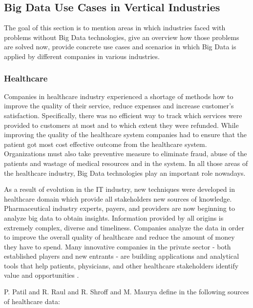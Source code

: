 \documentclass[runningheads]{llncs}
\begin{document}
\subsection{Big Data Use Cases in Vertical Industries}
The goal of this section is to mention areas in which industries faced with problems without Big Data technologies, give an overview how those problems are solved now, provide concrete use cases and scenarios in which Big Data is applied by different companies in various industries.

\subsubsection{Healthcare}

Companies in healthcare industry experienced a shortage of methods how to improve the quality of their service, reduce expenses and increase customer's satisfaction. Specifically, there was no efficient way to track which services were provided to customers at most and to which extent they were refunded. While improving the quality of the healthcare system companies had to ensure that the patient got most cost effective outcome from the healthcare system. Organizations must also take preventive measure to eliminate fraud, abuse of the patients and wastage of medical resources and in the system. In all those areas of the healthcare industry, Big Data technologies play an important role nowadays.

As a result of evolution in the IT industry, new techniques were developed in healthcare domain which provide all stakeholders new sources of knowledge. Pharmaceutical industry experts, payers, and providers are now beginning to analyze big data to obtain insights. Information provided by all origins is extremely complex, diverse and timeliness. Companies analyze the data in order to improve the overall quality of healthcare and reduce the amount of money they have to spend. Many innovative companies in the private sector - both established players and new entrants - are building applications and analytical tools that help patients, physicians, and other healthcare stakeholders identify value and opportunities \cite{USHEALTH}. 

P. Patil and R. Raul and R. Shroff and M. Maurya define in \cite{HEALTHARTICLE} the following sources of healthcare data:
\end{document}
